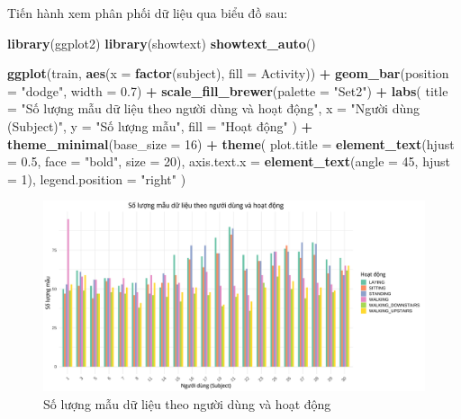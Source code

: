 \documentclass[
]{article}
\newenvironment{Shaded}{\begin{snugshade}}{\end{snugshade}}
\newcommand{\AttributeTok}[1]{\textcolor[rgb]{0.13,0.29,0.53}{#1}}
\newcommand{\DecValTok}[1]{\textcolor[rgb]{0.00,0.00,0.81}{#1}}
\newcommand{\FloatTok}[1]{\textcolor[rgb]{0.00,0.00,0.81}{#1}}
\newcommand{\FunctionTok}[1]{\textcolor[rgb]{0.13,0.29,0.53}{\textbf{#1}}}
\newcommand{\NormalTok}[1]{#1}
\newcommand{\SpecialCharTok}[1]{\textcolor[rgb]{0.81,0.36,0.00}{\textbf{#1}}}
\newcommand{\StringTok}[1]{\textcolor[rgb]{0.31,0.60,0.02}{#1}}
\begin{document}
Tiến hành xem phân phối dữ liệu qua biểu đồ sau:

\begin{Shaded}
\begin{Highlighting}[]
\FunctionTok{library}\NormalTok{(ggplot2)}
\FunctionTok{library}\NormalTok{(showtext)}
\FunctionTok{showtext\_auto}\NormalTok{()}

\FunctionTok{ggplot}\NormalTok{(train, }\FunctionTok{aes}\NormalTok{(}\AttributeTok{x =} \FunctionTok{factor}\NormalTok{(subject), }\AttributeTok{fill =}\NormalTok{ Activity)) }\SpecialCharTok{+}
  \FunctionTok{geom\_bar}\NormalTok{(}\AttributeTok{position =} \StringTok{"dodge"}\NormalTok{, }\AttributeTok{width =} \FloatTok{0.7}\NormalTok{) }\SpecialCharTok{+}
  \FunctionTok{scale\_fill\_brewer}\NormalTok{(}\AttributeTok{palette =} \StringTok{"Set2"}\NormalTok{) }\SpecialCharTok{+} 
  \FunctionTok{labs}\NormalTok{(}
    \AttributeTok{title =} \StringTok{"Số lượng mẫu dữ liệu theo người dùng và hoạt động"}\NormalTok{,}
    \AttributeTok{x =} \StringTok{"Người dùng (Subject)"}\NormalTok{,}
    \AttributeTok{y =} \StringTok{"Số lượng mẫu"}\NormalTok{,}
    \AttributeTok{fill =} \StringTok{"Hoạt động"}
\NormalTok{  ) }\SpecialCharTok{+}
  \FunctionTok{theme\_minimal}\NormalTok{(}\AttributeTok{base\_size =} \DecValTok{16}\NormalTok{) }\SpecialCharTok{+}
  \FunctionTok{theme}\NormalTok{(}
    \AttributeTok{plot.title =} \FunctionTok{element\_text}\NormalTok{(}\AttributeTok{hjust =} \FloatTok{0.5}\NormalTok{, }\AttributeTok{face =} \StringTok{"bold"}\NormalTok{, }\AttributeTok{size =} \DecValTok{20}\NormalTok{),}
    \AttributeTok{axis.text.x =} \FunctionTok{element\_text}\NormalTok{(}\AttributeTok{angle =} \DecValTok{45}\NormalTok{, }\AttributeTok{hjust =} \DecValTok{1}\NormalTok{),}
    \AttributeTok{legend.position =} \StringTok{"right"}
\NormalTok{  )}
\end{Highlighting}
\end{Shaded}

\begin{figure}
\centering
\includegraphics{report_files/figure-latex/unnamed-chunk-9-1.pdf}
\caption{Số lượng mẫu dữ liệu theo người dùng và hoạt động}
\end{figure}
\end{document}
